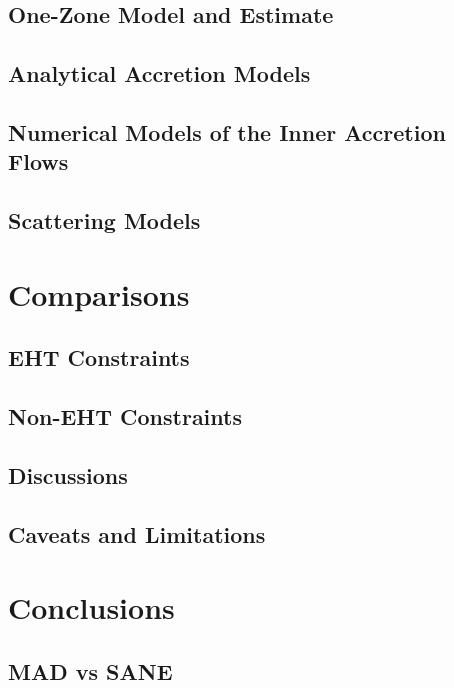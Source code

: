 \documentclass[twocolumn,twocolappendix,tighten,dvipsnames,linenumbers]{aastex63}
\begin{document}
\subsection{One-Zone Model and Estimate}

\subsection{Analytical Accretion Models}

\subsection{Numerical Models of the Inner Accretion Flows}

\subsection{Scattering Models}

\section{Comparisons}

\subsection{EHT Constraints}

\subsection{Non-EHT Constraints}

\subsection{Discussions}

\subsection{Caveats and Limitations}

\section{Conclusions}

\subsection{MAD vs SANE}
\end{document}

